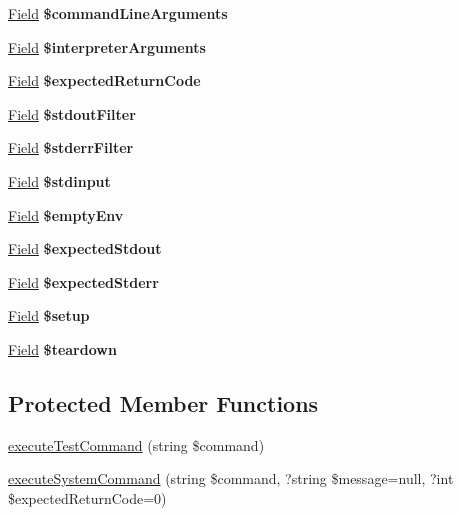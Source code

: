 \begin{DoxyCompactItemize}
\item 
\mbox{\label{classTest_a8e1e0c4ef28384dab9ed434b96b9c8e5}} 
\hyperlink{classField}{Field} {\bfseries \$command\+Line\+Arguments}
\item 
\mbox{\label{classTest_a2481e3e2d064e0d447c301baa8b9cb46}} 
\hyperlink{classField}{Field} {\bfseries \$interpreter\+Arguments}
\item 
\mbox{\label{classTest_a56d12011d910b9aa40ad467b85fe1a40}} 
\hyperlink{classField}{Field} {\bfseries \$expected\+Return\+Code}
\item 
\mbox{\label{classTest_a060f5bf12c22e7a4480a8a00759eea52}} 
\hyperlink{classField}{Field} {\bfseries \$stdout\+Filter}
\item 
\mbox{\label{classTest_a2407a1d6086e9406c4ce4415f213ac34}} 
\hyperlink{classField}{Field} {\bfseries \$stderr\+Filter}
\item 
\mbox{\label{classTest_ad01ebf52ac16148dabb9ec4ea55377bc}} 
\hyperlink{classField}{Field} {\bfseries \$stdinput}
\item 
\mbox{\label{classTest_a64a9b3cdb03f4c3ea863b57fa3ea1d73}} 
\hyperlink{classField}{Field} {\bfseries \$empty\+Env}
\item 
\mbox{\label{classTest_a26361a14649bfc158727f160a0a1ba86}} 
\hyperlink{classField}{Field} {\bfseries \$expected\+Stdout}
\item 
\mbox{\label{classTest_ad3f9aa30395f954146dd38e34191afea}} 
\hyperlink{classField}{Field} {\bfseries \$expected\+Stderr}
\item 
\mbox{\label{classTest_a7f746d846f82b595b8f42cc70018843b}} 
\hyperlink{classField}{Field} {\bfseries \$setup}
\item 
\mbox{\label{classTest_ada2e6af518692629f16df255ababf4ae}} 
\hyperlink{classField}{Field} {\bfseries \$teardown}
\end{DoxyCompactItemize}
\subsection*{Protected Member Functions}
\begin{DoxyCompactItemize}
\item 
\hyperlink{classTest_a76e2356e087e341bba538fef7b30a3dc}{execute\+Test\+Command} (string \$command)
\item 
\hyperlink{classTest_ac9eac02dbbf02d982dda6b4aaf4e28fd}{execute\+System\+Command} (string \$command, ?string \$message=null, ?int \$expected\+Return\+Code=0)
\end{DoxyCompactItemize}


